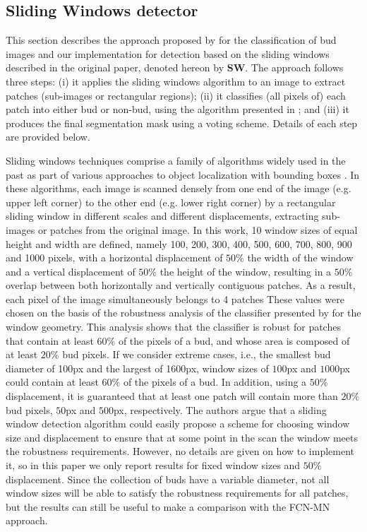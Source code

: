 \documentclass[a4paper,authoryear,review]{elsarticle}
\begin{document}
	\subsection{Sliding Windows detector}
	\label{sec:sw}
	
	This section describes the approach proposed by \citet{perez2017image} for the classification of bud images and our implementation for detection based on the sliding windows described in the original paper, denoted hereon by \textbf{SW}. The approach follows three steps: (i) it applies the sliding windows algorithm to an image to extract patches (sub-images or rectangular regions); (ii) it classifies (all pixels of) each patch into either bud or non-bud, using the algorithm presented in \citet{perez2017image}; and (iii) it produces the final segmentation mask using a voting scheme. Details of each step are provided below.
	
	Sliding windows techniques comprise a family of algorithms widely used in the past as part of various approaches to object localization with bounding boxes \citep{divvala2009empirical, wang2009hog, chum2007exemplar, ferrari2007groups, dalal2005histograms, rowley1996human}. In these algorithms, each image is scanned densely from one end of the image (e.g. upper left corner) to the other end (e.g. lower right corner) by a rectangular sliding window in different scales and different displacements, extracting sub-images or patches from the original image. In this work, 10 window sizes of equal height and width are defined, namely 100, 200, 300, 400, 500, 600, 700, 800, 900 and 1000 pixels, with a horizontal displacement of $50\%$ the width of the window and a vertical displacement of $50\%$ the height of the window, resulting in a $50\%$ overlap between both horizontally and vertically contiguous patches. As a result, each pixel of the image simultaneously belongs to 4 patches These values were chosen on the basis of the robustness analysis of the classifier presented by \citet{perez2017image} for the window geometry. This analysis shows that the classifier is robust for patches that contain at least $60\%$ of the pixels of a bud, and whose area is composed of at least $20\%$ bud pixels. If we consider extreme cases, i.e., the smallest bud diameter of 100px and the largest of 1600px, window sizes of $100$px and $1000$px could contain at least $60\%$ of the pixels of a bud. In addition, using a $50\%$ displacement, it is guaranteed that at least one patch will contain more than $20\%$ bud pixels, $50$px and $500$px, respectively. The authors argue that a sliding window detection algorithm could easily propose a scheme for choosing window size and displacement to ensure that at some point in the scan the window meets the robustness requirements. However, no details are given on how to implement it, so in this paper we only report results for fixed window sizes and $50\%$ displacement. Since the collection of buds have a variable diameter, not all window sizes will be able to satisfy the robustness requirements for all patches, but the results can still be useful to make a comparison with the FCN-MN approach.  
	
\end{document}

